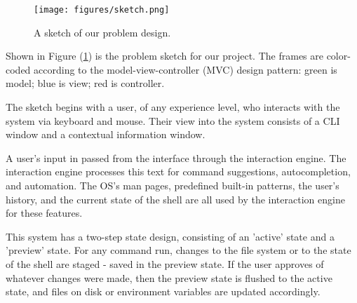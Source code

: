 \begin{figure}[h]
  \centering
  \texttt{[image: figures/sketch.png]}
  \caption{A sketch of our problem design.}
  \label{fig:sketch}
\end{figure}

Shown in Figure (\ref{fig:sketch}) is the problem sketch for our project. The
frames are color-coded according to the model-view-controller (MVC) design
pattern: green is model; blue is view; red is controller.

The sketch begins with a user, of any experience level, who interacts with the
system via keyboard and mouse. Their view into the system consists of a CLI
window and a contextual information window.

A user's input in passed from the interface through the interaction engine. The
interaction engine processes this text for command suggestions, autocompletion,
and automation. The OS's man pages, predefined built-in patterns, the user's
history, and the current state of the shell are all used by the interaction
engine for these features.

This system has a two-step state design, consisting of an 'active' state and a
'preview' state. For any command run, changes to the file system or to the state
of the shell are staged - saved in the preview state. If the user approves of
whatever changes were made, then the preview state is flushed to the active
state, and files on disk or environment variables are updated accordingly.
